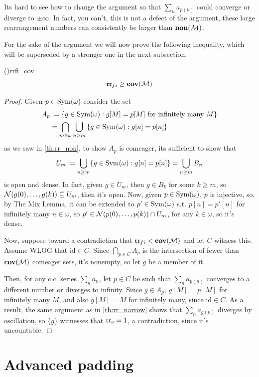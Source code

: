 Its hard to see how to change the argument so that $\sum_n a_{p(n)}$ could converge or diverge to $\pm\infty$. In fact, you can't, this is not a defect of the argument, these large rearrangement numbers can consistently be larger than $\textbf{non}(\mathcal{M})$.

For the sake of the argument we will now prove the following inequality, which will be superseded by a stronger one in the next subsection.

\begin{theorem}{(\cite{blass})}{rrfi_cov}
    $$\mathfrak{rr}_{fi}\geq\textbf{cov}(\mathcal{M})$$
\end{theorem}

\begin{proof}
    Given $p\in\mathrm{Sym}(\omega)$ consider the set
    \begin{align*}
        A_p & := \left\{g\in\mathrm{Sym}(\omega):g[M]=p[M]\text{ for infinitely many }M\right\}\\
        & = \bigcap_{m\in\omega}\bigcup_{n\geq m}\left\{g\in\mathrm{Sym}(\omega):g[n]=p[n]\right\}
    \end{align*}
    as we saw in \cref{th:rr_non}, to show $A_p$ is comeager, its sufficient to show that
    $$U_m:=\bigcup_{n\geq m}\{g\in\mathrm{Sym}(\omega):g[n]=p[n]\}=\bigcup_{n\geq m}B_n$$
    is open and dense. In fact, given $g\in U_m$, then $g\in B_k$ for some $k\geq m$, so $\mathcal{N}(g(0),\dots,g(k))\subseteq U_m$, then it's open. Now, given $p\in\mathrm{Sym}(\omega)$, $p$ is injective, so, by The Mix Lemma, it can be extended to $p'\in\mathrm{Sym}(\omega)$ s.t. $p[n]=p'[n]$ for infinitely many $n\in\omega$, so $p'\in \mathcal{N}(p(0),\dots,p(k))\cap U_m$, for any $k\in\omega$, so it's dense.

    Now, suppose toward a contradiction that $\mathfrak{rr}_{fi}<\textbf{cov}(\mathcal{M})$ and let $C$ witness this. Assume WLOG that $\text{id}\in C$. Since $\bigcap_{p\in C}A_p$ is the intersection of fewer than $\textbf{cov}(\mathcal{M})$ comeager sets, it's nonempty, so let $g$ be a member of it.

    Then, for any c.c. series $\sum_n a_n$, let $p\in C$ be such that $\sum_n a_{p(n)}$ converges to a different number or diverges to infinity. Since $g\in A_p$, $g[M]=p[M]$ for infinitely many $M$, and also $g[M]=M$ for infinitely many, since $\text{id}\in C$. As a result, the same argument as in \cref{th:rr_narrow} shows that $\sum_n a_{g(n)}$ diverges by oscillation, so $\{g\}$ witnesses that $\mathfrak{rr}_o=1$, a contradiction, since it's uncountable.
\end{proof}

\section{Advanced padding}

